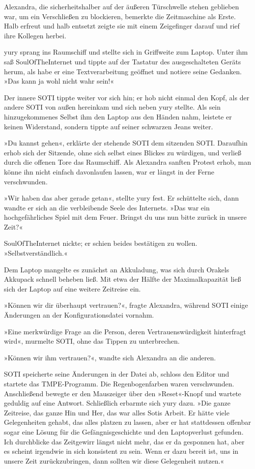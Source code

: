 Alexandra, die sicherheitshalber auf der äußeren Türschwelle stehen geblieben war, um ein Verschließen zu blockieren, bemerkte die Zeitmaschine als Erste. Halb erfreut und halb entsetzt zeigte sie mit einem Zeigefinger darauf und rief ihre Kollegen herbei.

yury sprang ins Raumschiff und stellte sich in Griffweite zum Laptop. Unter ihm saß SoulOfTheInternet und tippte auf der Tastatur des ausgeschalteten Geräts herum, als habe er eine Textverarbeitung geöffnet und notiere seine Gedanken. »Das kann ja wohl nicht wahr sein!«

Der innere SOTI tippte weiter vor sich hin; er hob nicht einmal den Kopf, als der andere SOTI von außen hereinkam und sich neben yury stellte. Als sein hinzugekommenes Selbst ihm den Laptop aus den Händen nahm, leistete er keinen Widerstand, sondern tippte auf seiner schwarzen Jeans weiter.

»Du kannst gehen«, erklärte der stehende SOTI dem sitzenden SOTI. Daraufhin erhob sich der Sitzende, ohne sich selbst eines Blickes zu würdigen, und verließ durch die offenen Tore das Raumschiff. Als Alexandra sanften Protest erhob, man könne ihn nicht einfach davonlaufen lassen, war er längst in der Ferne verschwunden.

»Wir haben das aber gerade getan«, stellte yury fest. Er schüttelte sich, dann wandte er sich an die verbleibende Seele des Internets. »Das war ein hochgefährliches Spiel mit dem Feuer. Bringst du uns nun bitte zurück in unsere Zeit?«

SoulOfTheInternet nickte; er schien beides bestätigen zu wollen. »Selbstverständlich.«

Dem Laptop mangelte es zunächst an Akkuladung, was sich durch Orakels Akkupack schnell beheben ließ. Mit etwa der Hälfte der Maximalkapazität ließ sich der Laptop auf eine weitere Zeitreise ein.

»Können wir dir überhaupt vertrauen?«, fragte Alexandra, während SOTI einige Änderungen an der Konfigurationsdatei vornahm.

»Eine merkwürdige Frage an die Person, deren Vertrauenswürdigkeit hinterfragt wird«, murmelte SOTI, ohne das Tippen zu unterbrechen.

»Können wir ihm vertrauen?«, wandte sich Alexandra an die anderen.

SOTI speicherte seine Änderungen in der Datei ab, schloss den Editor und startete das TMPE-Programm. Die Regenbogenfarben waren verschwunden. Anschließend bewegte er den Mauszeiger über den »Reset«-Knopf und wartete geduldig auf eine Antwort. Schließlich erbarmte sich yury dazu. »Die ganze Zeitreise, das ganze Hin und Her, das war alles Sotis Arbeit. Er hätte viele Gelegenheiten gehabt, das alles platzen zu lassen, aber er hat stattdessen offenbar sogar eine Lösung für die Gefängnisgeschichte und den Laptopverlust gefunden. Ich durchblicke das Zeitgewirr längst nicht mehr, das er da gesponnen hat, aber es scheint irgendwie in sich konsistent zu sein. Wenn er dazu bereit ist, uns in unsere Zeit zurückzubringen, dann sollten wir diese Gelegenheit nutzen.«

